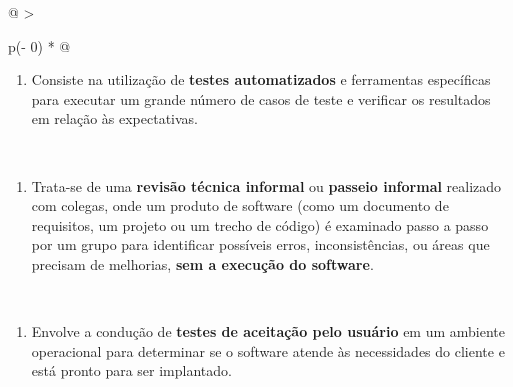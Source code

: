 \documentclass[
]{book}
\providecommand{\tightlist}{%
  \setlength{\itemsep}{0pt}\setlength{\parskip}{0pt}}
\begin{document}
\begin{longtable}[]{@{}
  >{\raggedright\arraybackslash}p{(\columnwidth - 0\tabcolsep) * }@{}}
\begin{minipage}[t]{\linewidth}
\begin{enumerate}
\def\labelenumi{\Alph{enumi})}
\setcounter{enumi}{2}
\tightlist
\item
  Consiste na utilização de \textbf{testes automatizados} e ferramentas específicas para executar um grande número de casos de teste e verificar os resultados em relação às expectativas.
\end{enumerate}
\end{minipage} \\
\begin{minipage}[t]{\linewidth}\raggedright
\begin{enumerate}
\def\labelenumi{\Alph{enumi})}
\setcounter{enumi}{3}
\tightlist
\item
  Trata-se de uma \textbf{revisão técnica informal} ou \textbf{passeio informal} realizado com colegas, onde um produto de software (como um documento de requisitos, um projeto ou um trecho de código) é examinado passo a passo por um grupo para identificar possíveis erros, inconsistências, ou áreas que precisam de melhorias, \textbf{sem a execução do software}.
\end{enumerate}
\end{minipage} \\
\begin{minipage}[t]{\linewidth}\raggedright
\begin{enumerate}
\def\labelenumi{\Alph{enumi})}
\setcounter{enumi}{4}
\tightlist
\item
  Envolve a condução de \textbf{testes de aceitação pelo usuário} em um ambiente operacional para determinar se o software atende às necessidades do cliente e está pronto para ser implantado.
\end{enumerate}
\end{minipage} \\
\end{longtable}
\end{document}
